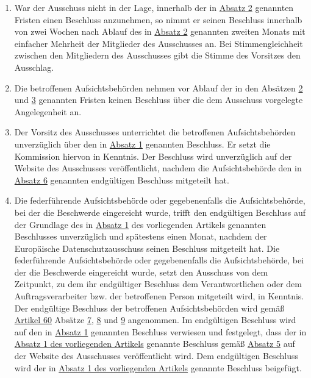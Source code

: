 \begin{enumerate}
  \item War der Ausschuss nicht in der Lage, innerhalb der in \hyperref[itm:65-2]{Absatz 2} genannten Fristen einen
   Beschluss anzunehmen, so nimmt er seinen Beschluss innerhalb von zwei Wochen nach Ablauf des in \hyperref[itm:65-2]
   {Absatz 2} genannten zweiten Monats mit einfacher Mehrheit der Mitglieder des Ausschusses an. Bei Stimmengleichheit
   zwischen den Mitgliedern des Ausschusses gibt die Stimme des Vorsitzes den Ausschlag.
  \label{itm:65-3}

  \item Die betroffenen Aufsichtsbehörden nehmen vor Ablauf der in den Absätzen \hyperref[itm:65-2]{2} und \hyperref
   [itm:65-3]{3} genannten Fristen keinen Beschluss über die dem Ausschuss vorgelegte Angelegenheit an.
  \label{itm:65-4}

  \item Der Vorsitz des Ausschusses unterrichtet die betroffenen Aufsichtsbehörden unverzüglich über den in \hyperref
   [itm:65-1]{Absatz 1} genannten Beschluss. Er setzt die Kommission hiervon in Kenntnis. Der Beschluss wird
   unverzüglich auf der Website des Ausschusses veröffentlicht, nachdem die Aufsichtsbehörde den in \hyperref[itm:65-6]
   {Absatz 6} genannten endgültigen Beschluss mitgeteilt hat.
  \label{itm:65-5}

  \item Die federführende Aufsichtsbehörde oder gegebenenfalls die Aufsichtsbehörde, bei der die Beschwerde eingereicht
   wurde, trifft den endgültigen Beschluss auf der Grundlage des in \hyperref[itm:65-1]{Absatz 1} des vorliegenden
   Artikels genannten Beschlusses unverzüglich und spätestens einen Monat, nachdem der Europäische Datenschutzausschuss
   seinen Beschluss mitgeteilt hat. Die federführende Aufsichtsbehörde oder gegebenenfalls die Aufsichtsbehörde, bei
   der die Beschwerde eingereicht wurde, setzt den Ausschuss von dem Zeitpunkt, zu dem ihr endgültiger Beschluss dem
   Verantwortlichen oder dem Auftragsverarbeiter bzw. der betroffenen Person mitgeteilt wird, in Kenntnis. Der
   endgültige Beschluss der betroffenen Aufsichtsbehörden wird gemäß \hyperref[ch:60]{Artikel 60} Absätze \hyperref
   [itm:60-7]{7}, \hyperref[itm:60-8]{8} und \hyperref[itm:60-9]{9} angenommen. Im endgültigen Beschluss wird auf den
   in \hyperref[itm:65-1]{Absatz 1} genannten Beschluss verwiesen und festgelegt, dass der in \hyperref[itm:65-1]
   {Absatz 1 des vorliegenden Artikels} genannte Beschluss gemäß \hyperref[itm:65-5]{Absatz 5} auf der Website des
   Ausschusses veröffentlicht wird. Dem endgültigen Beschluss wird der in \hyperref[itm:65-1]{Absatz 1 des vorliegenden
   Artikels} genannte Beschluss beigefügt.
  \label{itm:65-6}

\end{enumerate}


